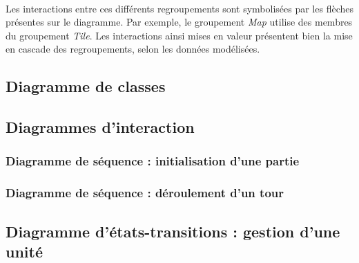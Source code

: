 \documentclass[a4paper]{article}
\begin{document}
\paragraph{}
Les interactions entre ces différents regroupements sont symbolisées par les flèches présentes sur le diagramme. Par exemple, le groupement \textit{Map} utilise des membres du groupement \textit{Tile}. Les interactions ainsi mises en valeur présentent bien la mise en cascade des regroupements, selon les données modélisées.



\subsection{Diagramme de classes}
\label{DDC}

\subsection{Diagrammes d'interaction}

\subsubsection{Diagramme de séquence : initialisation d'une partie}

\subsubsection{Diagramme de séquence : déroulement d'un tour}

\subsection{Diagramme d'états-transitions : gestion d'une unité}
\end{document}
